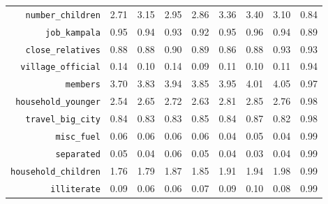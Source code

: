 \begin{longtable}{rrrrrrrrr}
  {\texttt{number\_children}} & 2.71 & 3.15 & 2.95 & 2.86 & 3.36 & 3.40 & 3.10 & 0.84 \\ 
  {\texttt{job\_kampala}} & 0.95 & 0.94 & 0.93 & 0.92 & 0.95 & 0.96 & 0.94 & 0.89 \\ 
  {\texttt{close\_relatives}} & 0.88 & 0.88 & 0.90 & 0.89 & 0.86 & 0.88 & 0.93 & 0.93 \\ 
  {\texttt{village\_official}} & 0.14 & 0.10 & 0.14 & 0.09 & 0.11 & 0.10 & 0.11 & 0.94 \\ 
  {\texttt{members}} & 3.70 & 3.83 & 3.94 & 3.85 & 3.95 & 4.01 & 4.05 & 0.97 \\ 
  {\texttt{household\_younger}} & 2.54 & 2.65 & 2.72 & 2.63 & 2.81 & 2.85 & 2.76 & 0.98 \\ 
  {\texttt{travel\_big\_city}} & 0.84 & 0.83 & 0.83 & 0.85 & 0.84 & 0.87 & 0.82 & 0.98 \\ 
  {\texttt{misc\_fuel}} & 0.06 & 0.06 & 0.06 & 0.06 & 0.04 & 0.05 & 0.04 & 0.99 \\ 
  {\texttt{separated}} & 0.05 & 0.04 & 0.06 & 0.05 & 0.04 & 0.03 & 0.04 & 0.99 \\ 
  {\texttt{household\_children}} & 1.76 & 1.79 & 1.87 & 1.85 & 1.91 & 1.94 & 1.98 & 0.99 \\ 
  {\texttt{illiterate}} & 0.09 & 0.06 & 0.06 & 0.07 & 0.09 & 0.10 & 0.08 & 0.99 \\ 
   \hline
\hline
\end{longtable}
